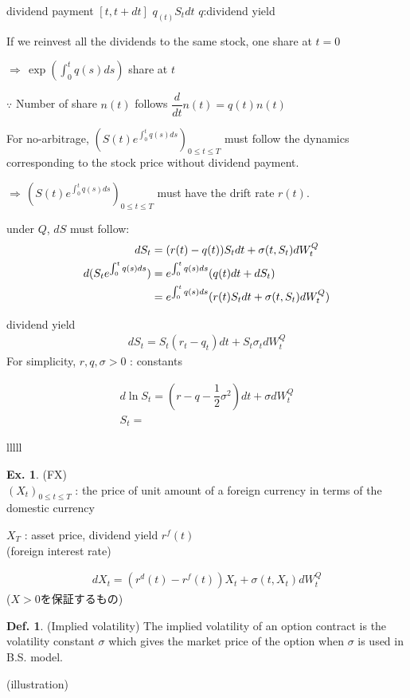 \documentclass[a4paper,11pt]{jsarticle}
\theoremstyle{definition}
\newtheorem{definition}{Def.}[subsection]
\newtheorem{ex}{Ex.}[subsection]
\newcommand{\df}[2]{\dfrac{#1}{#2}}
\begin{document}
dividend payment $[t,t+dt]$ $q_(t)S_t dt$
$q$:dividend yield

If we reinvest all the dividends to the same stock,
one share at $t=0$

$\Rightarrow \, \exp\left(\int_0^t q(s)ds \right)$ share at $t$

$\because$ Number of share $n(t)$ follows
$\df{d}{dt}n(t)=q(t)n(t)$


For no-arbitrage,
$\left(S(t)e^{\int_0^t q(s)ds}\right)_{0\leq t\leq T}$
must follow the dynamics corresponding to the stock price
without dividend payment.

$\Rightarrow \, \left(S(t)e^{\int_0^t q(s)ds}\right)_{0\leq t\leq T}$
must have the drift rate $r(t)$.

under $Q$, $dS$ must follow:
\begin{align}
  dS_t&=(r(t)-q(t))S_t dt+\sigma(t,S_t)dW_t^Q \\
  d(S_t e^{\int_0^t q(s)ds})
  &=e^{\int_0^t q(s)ds}(q(t)dt+dS_t) \notag \\
  &=e^{\int_0^t q(s)ds}(r(t)S_t dt+\sigma(t,S_t)dW_t^Q)
\end{align}

dividend yield
\begin{align}
  dS_t=S_t(r_t-q_t)dt+S_t \sigma_t dW_t^Q
\end{align}
For simplicity, $r,q,\sigma >0$ : constants

\begin{align}
  d\ln S_t = \left(r-q-\df{1}{2}\sigma^2\right)dt+\sigma dW_t^Q\\
  S_t=
\end{align}




lllll


\begin{ex}{(FX)}\\
  $(X_t)_{0\leq t\leq T}$ : the price of unit amount of
  a foreign currency in terms of the domestic currency
  
  $X_T$ : asset price, dividend yield $r^f(t)$ \\
  (foreign interest rate)

  \begin{align}
    dX_t = (r^d(t)-r^f(t))X_t + \sigma (t,X_t)dW_t^Q
  \end{align}
  ($X>0$を保証するもの)
\end{ex}

\begin{definition}{(Implied volatility)}
  The implied volatility of an option contract is the volatility
  constant $\sigma$ which gives the market price of the option
  when $\sigma$ is used in B.S. model.
\end{definition}
(illustration)
\end{document}
